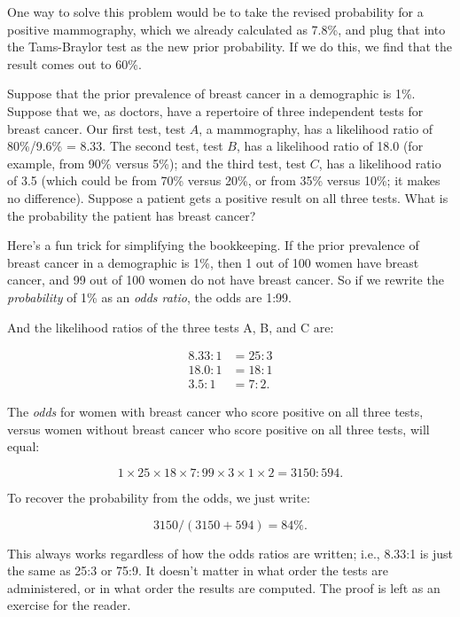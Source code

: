 {{{
 One way to solve this problem would be to take the revised
probability for a positive mammography, which we already calculated as
7.8\%, and plug that into the Tams-Braylor test as the new prior
probability. If we do this, we find that the result comes out to 60\%.}

{
 Suppose that the prior prevalence of breast cancer in a
demographic is 1\%. Suppose that we, as doctors, have a repertoire of
three independent tests for breast cancer. Our first test, test $A$, a
mammography, has a likelihood ratio of 80\%/9.6\% = 8.33. The second
test, test $B$, has a likelihood ratio of 18.0 (for example, from 90\%
versus 5\%); and the third test, test $C$, has a likelihood ratio of 3.5
(which could be from 70\% versus 20\%, or from 35\% versus 10\%; it
makes no difference). Suppose a patient gets a positive result on all
three tests. What is the probability the patient has breast cancer?}

{
 Here's a fun trick for simplifying the
bookkeeping. If the prior prevalence of breast cancer in a demographic
is 1\%, then 1 out of 100 women have breast cancer, and 99 out of 100
women do not have breast cancer. So if we rewrite the
\textit{probability} of 1\% as an \textit{odds ratio}, the odds are
1:99.}

{
 And the likelihood ratios of the three tests A, B, and C are:}

\begin{align*}
 8.33:1 &= 25:3\\
 18.0:1 &= 18:1\\
 3.5:1 &= 7:2.
\end{align*}

{
 The \textit{odds} for women with breast cancer who score positive
on all three tests, versus women without breast cancer who score
positive on all three tests, will equal:}

\begin{equation*}
 1 \times 25 \times 18 \times 7 : 99 \times 3 \times 1 \times 2 = 3150 : 594.
\end{equation*}

{
 To recover the probability from the odds, we just write:}

\begin{equation*}
 3150 / (3150 + 594) = 84\%.
\end{equation*}


{
 This always works regardless of how the odds ratios are written;
i.e., 8.33:1 is just the same as 25:3 or 75:9. It
doesn't matter in what order the tests are
administered, or in what order the results are computed. The proof is
left as an exercise for the reader.}

}}
